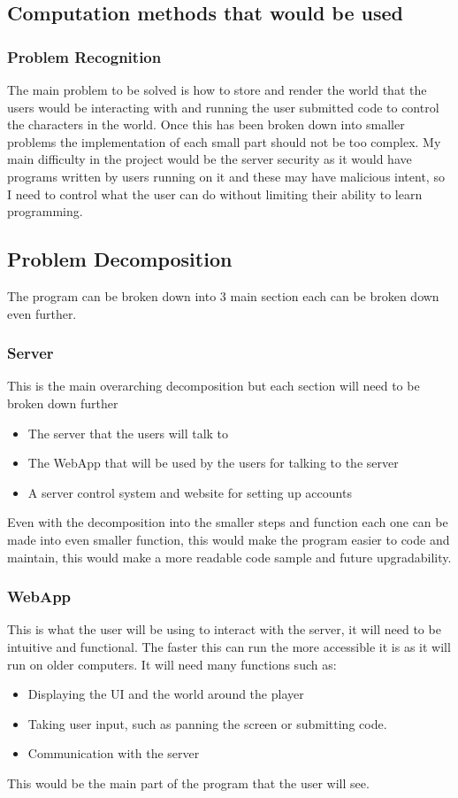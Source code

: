 \documentclass[12pt]{article}
\begin{document}
\subsection{Computation methods that would be used}
\subsubsection{Problem Recognition}
The main problem to be solved is how to store and render the world that the users would be interacting with and running the user submitted code to control the characters in the world. Once this has been broken down into smaller problems the implementation of each small part should not be too complex. My main difficulty in the project would be the server security as it would have programs written by users running on it and these may have malicious intent, so I need to control what the user can do without limiting their ability to learn programming.

\subsection{Problem Decomposition}
The program can be broken down into 3 main section each can be broken down even further.

\subsubsection{Server}
This is the main overarching decomposition but each section will need to be broken down further
\begin{itemize}
    \item The server that the users will talk to
    \item The WebApp that will be used by the users for talking to the server
    \item A server control system and website for setting up accounts
\end{itemize}
Even with the decomposition into the smaller steps and function each one can be made into even smaller function, this would make the program easier to code and maintain, this would make a more readable code sample and future upgradability.

\subsubsection{WebApp}
This is what the user will be using to interact with the server, it will need to be intuitive and functional. The faster this can run the more accessible it is as it will run on older computers.
It will need many functions such as:
\begin{itemize}
    \item Displaying the UI and the world around the player
    \item Taking user input, such as panning the screen or submitting code.
    \item Communication with the server
\end{itemize}
This would be the main part of the program that the user will see.
\end{document}
